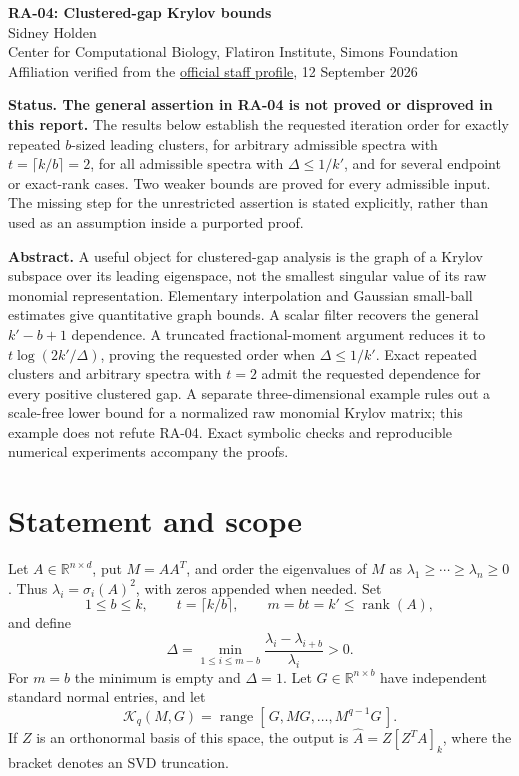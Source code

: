 \documentclass[11pt]{article}
\theoremstyle{definition}
\newcommand{\R}{\mathbb R}
\newcommand{\range}{\operatorname{range}}
\newcommand{\rank}{\operatorname{rank}}
\newcommand{\K}{\mathcal K}
\begin{document}
\begin{center}
{\Large\bfseries RA-04: Clustered-gap Krylov bounds}
\\[6pt]
Sidney Holden\\
{\small Center for Computational Biology, Flatiron Institute, Simons Foundation}\\
{\small Affiliation verified from the \href{https://www.simonsfoundation.org/people/sidney-holden/}{official staff profile}, 12 September 2026}
\end{center}
\vspace{1mm}

\textbf{Status. The general assertion in RA-04 is not proved or disproved in this report.}
The results below establish the requested iteration order for exactly repeated
$b$-sized leading clusters, for arbitrary admissible spectra with
$t=\lceil k/b\rceil=2$, for all admissible spectra with $\Delta\leq1/k'$, and for several
endpoint or exact-rank cases. Two weaker bounds are proved for every
admissible input. The missing step for the
unrestricted assertion is stated explicitly, rather than used as an assumption
inside a purported proof.

\textbf{Abstract.}
A useful object for clustered-gap analysis is the graph of a Krylov subspace
over its leading eigenspace, not the smallest singular value of its raw
monomial representation. Elementary interpolation and Gaussian small-ball
estimates give quantitative graph bounds. A scalar filter recovers the
general $k'-b+1$ dependence. A truncated fractional-moment argument reduces
it to $t\log(2k'/\Delta)$, proving the requested order when
$\Delta\leq1/k'$. Exact repeated clusters and arbitrary spectra with
$t=2$ admit the requested dependence for every positive clustered gap. A separate three-dimensional
example rules out a scale-free lower bound for a normalized raw monomial
Krylov matrix; this example does not refute RA-04. Exact symbolic checks and
reproducible numerical experiments accompany the proofs.

\begingroup
\small
\setlength{\parskip}{0pt}
\tableofcontents
\endgroup
\newpage

\section{Statement and scope}
\label{sec:scope}

Let $A\in\R^{n\times d}$, put $M=AA^T$, and order the eigenvalues of $M$ as
$\lambda_1\geq\cdots\geq\lambda_n\geq0$. Thus $\lambda_i=\sigma_i(A)^2$,
with zeros appended when needed. Set
\[
  1\leq b\leq k,\qquad t=\lceil k/b\rceil,\qquad m=bt=k'
  \leq\rank(A),
\]
and define
\begin{equation}
 \Delta=\min_{1\leq i\leq m-b}
 \frac{\lambda_i-\lambda_{i+b}}{\lambda_i}>0.
 \label{eq:gap}
\end{equation}
For $m=b$ the minimum is empty and $\Delta=1$.
Let $G\in\R^{n\times b}$ have independent standard normal entries, and let
\begin{equation}
 \K_q(M,G)=\range[\,G,MG,\ldots,M^{q-1}G\,].
 \label{eq:krylov}
\end{equation}
If $Z$ is an orthonormal basis of this space, the output is
$\widehat A=Z[Z^TA]_k$, where the bracket denotes an SVD truncation.
\end{document}
